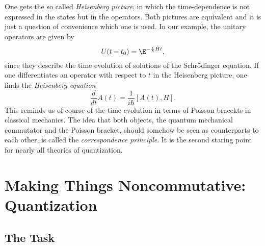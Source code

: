 One gets the so called \emph{Heisenberg picture}, in which the 
time-dependence is not expressed in the states but in the operators. Both 
pictures are equivalent and it is just a question of convenience which one is 
used. In our example, the unitary operators are given by
\begin{equation*}
	U(t - t_0)
	=
	\E^{- \frac{i}{\hbar} \hat{H} t},
\end{equation*}
since they describe the time evolution of solutions of the Schr\"odinger 
equation. If one differentiates an operator with respect to $t$ in the 
Heisenberg picture, one finds the \emph{Heisenberg equation}
\begin{equation*}
	\frac{d}{dt}
	A(t)
	=
	\frac{1}{i \hbar}
	[A(t), H].
\end{equation*}
This reminds us of course of the time evolution in terms of Poisson bracekts in 
classical mechanics. The idea that both objects, the quantum mechanical commutator 
and the Poisson bracket, should somehow be seen as counterparts to each other, is 
called the \emph{correspondence principle}. It is the second staring point for 
nearly all theories of quantization.



\section{Making Things Noncommutative: Quantization}
\label{sec:chap2_Quantization}

\subsection{The Task}
\label{subsec:chap2_Task}

